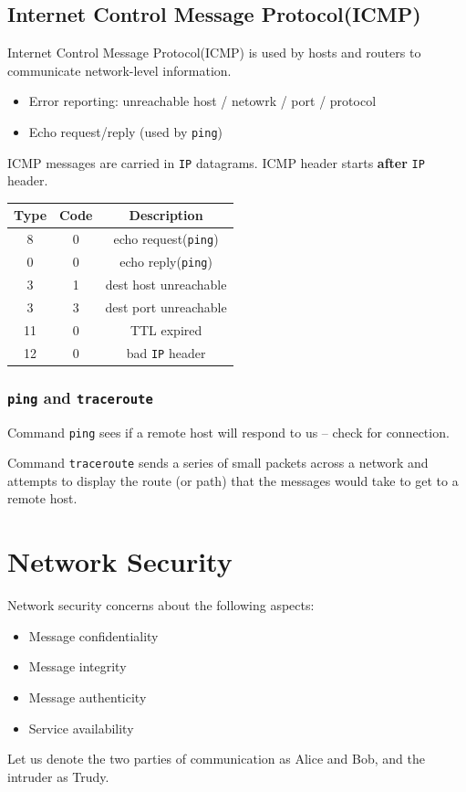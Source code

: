 \documentclass[12pt]{article}
\newcommand\IP{\texttt{IP} }
\theoremstyle{definition}
\begin{document}
\subsection{Internet Control Message Protocol(ICMP)}
Internet Control Message Protocol(ICMP) is used by hosts and routers to communicate network-level information.
\begin{itemize}
  \item Error reporting: unreachable host / netowrk / port / protocol
  \item Echo request/reply (used by \texttt{ping})
\end{itemize}
ICMP messages are carried in \IP datagrams. ICMP header starts \textbf{after} \IP header.
\begin{table}[h]
\centering
\begin{tabular}{|c|c|c|}\hline
Type&Code&Description\\\hline
8&0&echo request(\texttt{ping})\\\hline
0&0&echo reply(\texttt{ping})\\\hline
3&1&dest host unreachable\\\hline
3&3&dest port unreachable\\\hline
11&0&TTL expired\\\hline
12&0&bad \IP header\\\hline
\end{tabular}
\end{table}
\subsubsection{\texttt{ping} and \texttt{traceroute}}
Command \texttt{ping} sees if a remote host will respond to us -- check for connection.

Command \texttt{traceroute} sends a series of small packets across a network and attempts to display the route (or path) that the messages would take to get to a remote host.
\clearpage
\section{Network Security}
Network security concerns about the following aspects:
\begin{itemize}
\item Message confidentiality
\item Message integrity
\item Message authenticity
\item Service availability
\end{itemize}
Let us denote the two parties of communication as Alice and Bob, and the intruder as Trudy.
\end{document}
